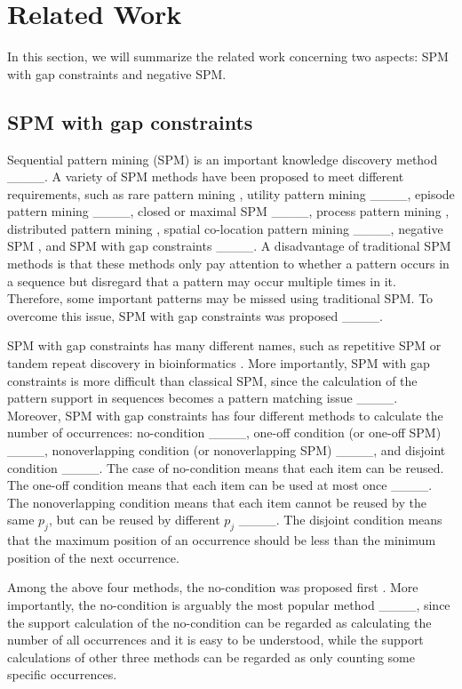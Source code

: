 \section{Related Work}
\label{section2}
In this section, we will summarize the related work concerning two aspects: SPM with gap constraints and negative SPM. 

\subsection{SPM with gap constraints}
Sequential pattern mining (SPM)  is an important knowledge discovery method ____. A variety of SPM methods have been proposed to meet different requirements, such as rare pattern mining \cite {rarepattern,rarepattern2}, utility pattern mining ____, episode pattern mining ____, closed or maximal SPM  ____, process pattern mining \cite {processmining1, processmining2}, distributed pattern mining \cite {distributedmining}, spatial co-location pattern mining ____, negative SPM \cite {dong2023, dong2018}, and SPM with gap constraints ____. A disadvantage of traditional SPM methods is that these methods only pay attention to whether a pattern occurs in a sequence but disregard that a pattern may occur multiple times in it. Therefore, some important patterns may be missed using traditional SPM.  To overcome this issue, SPM with gap constraints was proposed ____. 

SPM with gap constraints has many different names, such as repetitive SPM \cite {yongxintong} or tandem repeat discovery in bioinformatics \cite {tandemrepeat}. More importantly, SPM with gap constraints is more difficult than classical SPM, since the calculation of the pattern support in sequences becomes a pattern matching issue ____. Moreover, SPM with gap constraints has four different methods to calculate the number of occurrences: no-condition  ____, one-off condition (or one-off SPM) ____, nonoverlapping condition (or nonoverlapping SPM) ____, and disjoint condition ____. The case of no-condition means that each item can be reused. The one-off condition means that each item can be used at most once ____. The nonoverlapping condition means that each item cannot be reused by the same $p_j$, but can be reused by different $p_j$ ____. The disjoint condition means that the maximum position of an occurrence should be less than the minimum position of the next occurrence. 

Among the above four methods, the no-condition was proposed first \cite {33_Zhang2007}. More importantly, the no-condition is arguably the most popular method ____, since the support calculation of the no-condition can be regarded as calculating the number of all occurrences and it is easy to be understood, while the support calculations of other three methods can be regarded as only counting some specific occurrences.



